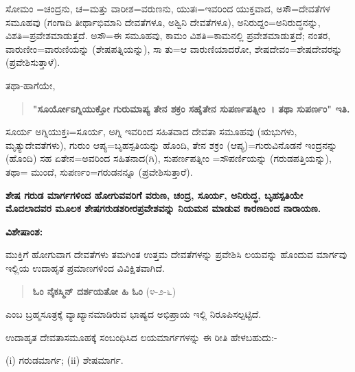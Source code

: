 ಸೋಮಂ =ಚಂದ್ರನು, ಚ=ಮತ್ತು ವಾರೀಶ=ವರುಣನು, ಯುತಃ=ಇವರಿಂದ ಯುಕ್ತವಾದ, ಅಸೌ=ದೇವತೆಗಳ ಸಮೂಹವು (ಗಂಗಾದಿ ತೀರ್ಥಾಭಿಮಾನಿ ದೇವತೆಗಳೂ, ಅಶ್ವಿನಿ ದೇವತೆಗಳೂ), ಅನಿರುದ್ದಂ=ಅನಿರುದ್ಧನನ್ನು, ವಿಶತಿ=ಪ್ರವೇಶಮಾಡುತ್ತದೆ. ಅಸೌ=ಈ ಸಮೂಹವು, ಕಾಮಂ ವಿಶತಿ=ಕಾಮನಲ್ಲಿ ಪ್ರವೇಶಮಾಡುತ್ತದೆ; ನಂತರ, ವಾರುಣೀಂ=\break ವಾರುಣಿಯನ್ನು (ಶೇಷಪತ್ನಿಯನ್ನು), ಸಾ ತು=ಆ ವಾರುಣಿಯಾದರೋ, ಶೇಷದೇವಂ=ಶೇಷ\-ದೇವರನ್ನು (ಪ್ರವೇಶಿಸುತ್ತಾಳೆ).

ತಥಾ-ಹಾಗೆಯೇ,

\begin{verse}
\textbf{"ಸೂರ್ಯೋಽಗ್ನಿಯುಕ್ತೋ ಗುರುಮಾಪ್ಯ ತೇನ ಶಕ್ರಂ ಸಹೈತೇನ ಸುಪರ್ಣಪತ್ನೀಂ~। ತಥಾ ಸುಪರ್ಣಂ" ಇತಿ.}
\end{verse}

ಸೂರ್ಯ ಅಗ್ನಿಯುಕ್ತಃ=ಸೂರ್ಯ, ಅಗ್ನಿ ಇವರಿಂದ ಸಹಿತವಾದ ದೇವತಾ ಸಮೂಹವು (ಋಭುಗಳು, ಮೃತ್ಯುದೇವತೆಗಳು), ಗುರುಂ ಆಪ್ಯ=ಬೃಹಸ್ಪತಿಯನ್ನು ಹೊಂದಿ, ತೇನ ಶಕ್ರಂ (ಆಪ್ಯ)=ಗುರುವಿನೊಡನೆ ಇಂದ್ರನನ್ನು (ಹೊಂದಿ) ಸಹ ಏತೇನ=ಅವರಿಂದ ಸಹಿತನಾದ(ಗಿ), ಸುಪರ್ಣಪತ್ನೀಂ =ಸೌಪರ್ಣಿಯನ್ನು (ಗರುಡಪತ್ತಿಯನ್ನು), ತಥಾ= ಮುಂದೆ, ಸುಪರ್ಣಂ=ಗರುಡನನ್ನೂ (ಪ್ರವೇಶಿಸುತ್ತಾರೆ).

\begin{center}
\textbf{ಶೇಷ ಗರುಡ ಮಾರ್ಗಗಳಿಂದ ಹೋಗುವವರಿಗೆ ವರುಣ, ಚಂದ್ರ, ಸೂರ್ಯ, ಅನಿರುದ್ಧ, ಬೃಹಸ್ಪತಿಯೇ ಮೊದಲಾದವರ ಮೂಲಕ ಶೇಷಗರುಡಶರೀರಪ್ರವೇಶವನ್ನು ನಿಯಮನ ಮಾಡುವ ಕಾರಣದಿಂದ ನಾರಾಯಣ.}
\end{center}

\noindent
\textbf{ವಿಶೇಷಾಂಶ:\enginline{-}}

ಮುಕ್ತಿಗೆ ಹೋಗುವಾಗ ದೇವತೆಗಳು ತಮಗಿಂತ ಉತ್ತಮ ದೇವತೆಗಳನ್ನು ಪ್ರವೇಶಿಸಿ ಲಯವನ್ನು ಹೊಂದುವ ಮಾರ್ಗವು ಇಲ್ಲಿಯ ಉದಾಹೃತ ಪ್ರಮಾಣಗಳಿಂದ ವಿವಿಕ್ಷಿತವಾಗಿದೆ.

\begin{verse}
\textbf{ಓಂ ನೈಕಸ್ಮಿನ್ ದರ್ಶಯತೋ ಹಿ ಓಂ} (೪-೨-೬)
\end{verse}

\noindent
ಎಂಬ ಬ್ರಹ್ಮಸೂತ್ರಕ್ಕೆ ವ್ಯಾಖ್ಯಾನಮಾಡಿರುವ ಭಾಷ್ಯದ ಅಭಿಪ್ರಾಯ ಇಲ್ಲಿ ನಿರೂಪಿಸಲ್ಪಟ್ಟಿದೆ.

ಉದಾಹೃತ ದೇವತಾಸಮೂಹಕ್ಕೆ ಸಂಬಂಧಿಸಿದ ಲಯಮಾರ್ಗಗಳನ್ನು ಈ ರೀತಿ ಹೇಳ\-ಬಹುದು:-

(i) ಗರುಡಮಾರ್ಗ; (ii) ಶೇಷಮಾರ್ಗ.


